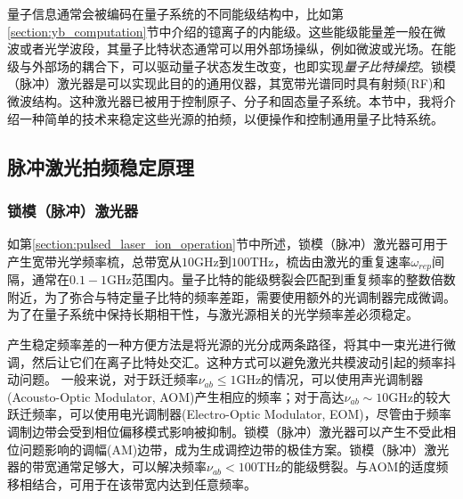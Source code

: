 量子信息通常会被编码在量子系统的不同能级结构中，比如第\ref{section:yb_computation}节中介绍的镱离子的内能级。这些能级能量差一般在微波或者光学波段，其量子比特状态通常可以用外部场操纵，例如微波或光场。在能级与外部场的耦合下，可以驱动量子状态发生改变，也即实现\emph{量子比特操控}。锁模（脉冲）激光器是可以实现此目的的通用仪器，其宽带光谱同时具有射频(RF)和微波结构。这种激光器已被用于控制原子\cite[]{Hayes_Matsukevich_Maunz_Hucul_Quraishi_Olmschenk_Campbell_Mizrahi_Senko_Monroe_2010}、分子\cite[]{Peer_Shapiro_Stowe_Shapiro_Ye_2007}和固态量子系统\cite[]{Greve_Press_McMahon_Yamamoto_2013}。本节中，我将介绍一种简单的技术来稳定这些光源的拍频，以便操作和控制通用量子比特系统\cite[]{ladd2010quantum}。

\subsection[脉冲激光拍频稳定原理]{脉冲激光拍频稳定原理}





\subsubsection[锁模（脉冲）激光器]{锁模（脉冲）激光器}
如第\ref{section:pulsed_laser_ion_operation}节中所述，锁模（脉冲）激光器可用于产生宽带光学频率梳，总带宽从$10$GHz到$100 $THz，梳齿由激光的重复速率$\omega_{rep}$间隔，通常在$0.1-1 $GHz范围内。量子比特的能级劈裂会匹配到重复频率的整数倍数附近，为了弥合与特定量子比特的频率差距，需要使用额外的光调制器完成微调\cite[]{Hayes_Matsukevich_Maunz_Hucul_Quraishi_Olmschenk_Campbell_Mizrahi_Senko_Monroe_2010}。为了在量子系统中保持长期相干性，与激光源相关的光学频率差必须稳定\cite[]{Stick_Hensinger_Olmschenk_Madsen_Schwab_Monroe_2006}。

产生稳定频率差的一种方便方法是将光源的光分成两条路径，将其中一束光进行微调，然后让它们在离子比特处交汇。这种方式可以避免激光共模波动引起的频率抖动问题\cite[]{Thomas_Hemmer_Ezekiel_Leiby_Picard_Willis_2002}。
一般来说，对于跃迁频率$\nu_{ab}\leq 1$GHz的情况，可以使用声光调制器(Acousto-Optic Modulator, AOM)产生相应的频率；对于高达$\nu_{ab} \sim 10 $GHz的较大跃迁频率，可以使用电光调制器(Electro-Optic Modulator, EOM)，尽管由于频率调制边带会受到相位偏移模式影响被抑制\cite[]{Lee_Blinov_Brickman_Deslauriers_Madsen_Miller_Moehring_Stick_Monroe_2003}。锁模（脉冲）激光器可以产生不受此相位问题影响的调幅(AM)边带，成为生成调控边带的极佳方案。锁模（脉冲）激光器的带宽通常足够大，可以解决频率$\nu_{ab} < 100 $THz的能级劈裂。与AOM的适度频移相结合，可用于在该带宽内达到任意频率。


